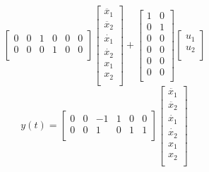 \documentclass{article}
\begin{document}
\begin{enumerate}[(a)]
$$\begin{bmatrix}
 0 &  0 & 1 & 0 & 0 & 0 \\
 0 &  0 & 0 & 1 & 0 & 0 \\
\end{bmatrix}
\begin{bmatrix}
\ddot{x_1} \\
\ddot{x_2} \\
\dot{x_1} \\
\dot{x_2} \\
x_1 \\
x_2 \\
\end{bmatrix}
+
\begin{bmatrix}
1 & 0  \\
0 & 1  \\
0 & 0  \\
0 & 0  \\
0 & 0  \\
0 & 0  \\
\end{bmatrix}
\begin{bmatrix}
u_1 \\
u_2 \\
\end{bmatrix}
$$
$$
y(t) =
\begin{bmatrix}
0 & 0 & -1 & 1 & 0 & 0 \\
0 & 0 &  1 & 0 & 1 & 1 \\
\end{bmatrix}
\begin{bmatrix}
\ddot{x_1} \\
\ddot{x_2} \\
\dot{x_1} \\
\dot{x_2} \\
x_1 \\
x_2 \\
\end{bmatrix}
$$


\end{enumerate}
\end{document}
